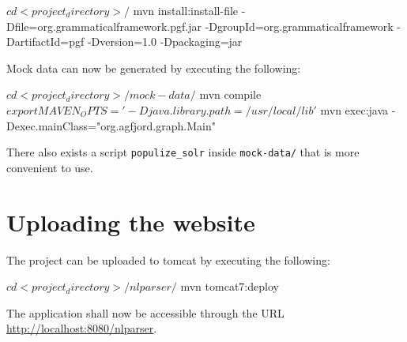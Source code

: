 \begin{terminal}
$ cd <project_directory>/
$ mvn install:install-file -Dfile=org.grammaticalframework.pgf.jar 
                           -DgroupId=org.grammaticalframework 
                           -DartifactId=pgf -Dversion=1.0 -Dpackaging=jar
\end{terminal}

Mock data can now be generated by executing the following:


\begin{terminal}
$ cd <project_directory>/mock-data/
$ mvn compile
$ export MAVEN_OPTS='-Djava.library.path=/usr/local/lib'
$ mvn exec:java -Dexec.mainClass="org.agfjord.graph.Main"
\end{terminal}

There also exists a script \texttt{populize\_solr} inside \texttt{mock-data/} that is more convenient to use.

\section{Uploading the website}

The project can be uploaded to tomcat by executing the following:

\begin{terminal}
$ cd <project_directory>/nlparser/
$ mvn tomcat7:deploy
\end{terminal}

The application shall now be accessible through the URL
\newline
 \url{http://localhost:8080/nlparser}.
